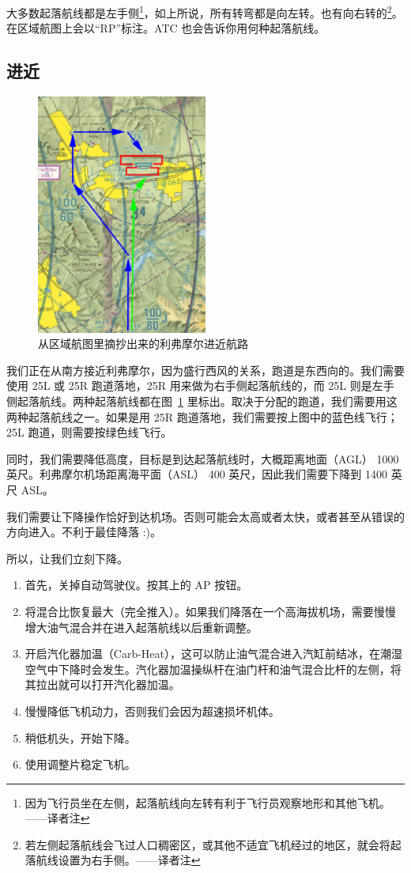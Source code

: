 大多数起落航线都是左手侧\footnote{因为飞行员坐在左侧，起落航线向左转有利于飞行员观察地形和其他飞机。——译者注}，如上所说，所有转弯都是向左转。也有向右转的\footnote{若左侧起落航线会飞过人口稠密区，或其他不适宜飞机经过的地区，就会将起落航线设置为右手侧。——译者注}。在区域航图上会以“RP”标注。ATC 也会告诉你用何种起落航线。

\subsection{进近}

\begin{figure}[!htp]
\centering
\includegraphics[width=0.5\textwidth]{livermore_pattern3}
\caption{从区域航图里摘抄出来的利弗摩尔进近航路\label{approach}}
\end{figure}

我们正在从南方接近利弗摩尔，因为盛行西风的关系，跑道是东西向的。我们需要使用 25L 或 25R 跑道落地，25R 用来做为右手侧起落航线的，而 25L 则是左手侧起落航线。两种起落航线都在图~\ref{approach} 里标出。取决于分配的跑道，我们需要用这两种起落航线之一。如果是用 25R 跑道落地，我们需要按上图中的蓝色线飞行；25L 跑道，则需要按绿色线飞行。

同时，我们需要降低高度，目标是到达起落航线时，大概距离地面（AGL） 1000 英尺。利弗摩尔机场距离海平面（ASL） 400 英尺，因此我们需要下降到 1400 英尺 ASL。

我们需要让下降操作恰好到达机场。否则可能会太高或者太快，或者甚至从错误的方向进入。不利于最佳降落 :)。

所以，让我们立刻下降。

\begin{enumerate}
\item 首先，关掉自动驾驶仪。按其上的 AP 按钮。
\item 将混合比恢复最大（完全推入）。如果我们降落在一个高海拔机场，需要慢慢增大油气混合并在进入起落航线以后重新调整。
\item 开启汽化器加温（Carb-Heat），这可以防止油气混合进入汽缸前结冰，在潮湿空气中下降时会发生。汽化器加温操纵杆在油门杆和油气混合比杆的左侧，将其拉出就可以打开汽化器加温。
\item 慢慢降低飞机动力，否则我们会因为超速损坏机体。
\item 稍低机头，开始下降。
\item 使用调整片稳定飞机。
\end{enumerate}

